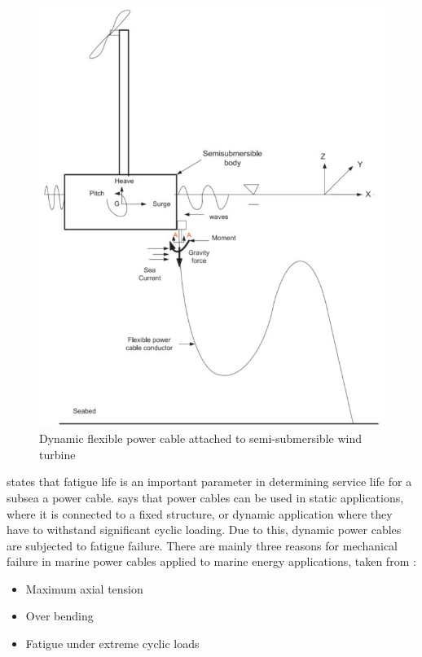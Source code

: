 \begin{figure}[H]
\centering
\includegraphics[scale=0.7]{figures/float}
\caption[$\; \:$Dynamic flexible power cable attached to semi-submersible wind turbine]{Dynamic flexible power cable attached to semi-submersible wind turbine \cite{Nasution2013}}
 \label{fig:float}
\end{figure}
\noindent \cite{YangShun-Han2017} states that fatigue life is an important parameter in determining service life for a subsea a power cable. \cite{Thies2012} says that power cables can be used in static applications, where it is connected to a fixed structure, or dynamic application where they have to withstand significant cyclic loading. Due to this, dynamic power cables are subjected to fatigue failure.
There are mainly three reasons for mechanical failure in marine power cables applied to marine energy applications, taken from \cite{Thies2012} :

\begin{itemize}
    \item Maximum axial tension
    \item Over bending
    \item Fatigue under extreme cyclic loads
\end{itemize}

